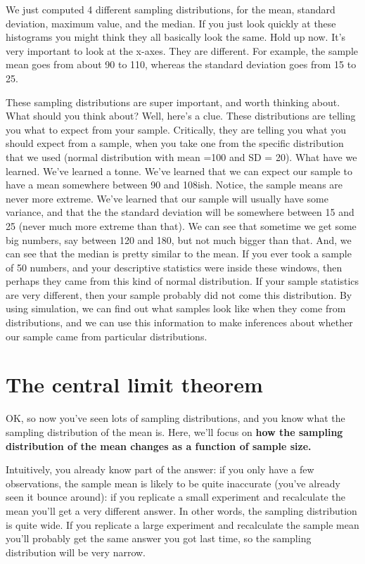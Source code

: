 \documentclass[
]{book}
\begin{document}
We just computed 4 different sampling distributions, for the mean, standard deviation, maximum value, and the median. If you just look quickly at these histograms you might think they all basically look the same. Hold up now. It's very important to look at the x-axes. They are different. For example, the sample mean goes from about 90 to 110, whereas the standard deviation goes from 15 to 25.

These sampling distributions are super important, and worth thinking about. What should you think about? Well, here's a clue. These distributions are telling you what to expect from your sample. Critically, they are telling you what you should expect from a sample, when you take one from the specific distribution that we used (normal distribution with mean =100 and SD = 20). What have we learned. We've learned a tonne. We've learned that we can expect our sample to have a mean somewhere between 90 and 108ish. Notice, the sample means are never more extreme. We've learned that our sample will usually have some variance, and that the the standard deviation will be somewhere between 15 and 25 (never much more extreme than that). We can see that sometime we get some big numbers, say between 120 and 180, but not much bigger than that. And, we can see that the median is pretty similar to the mean. If you ever took a sample of 50 numbers, and your descriptive statistics were inside these windows, then perhaps they came from this kind of normal distribution. If your sample statistics are very different, then your sample probably did not come this distribution. By using simulation, we can find out what samples look like when they come from distributions, and we can use this information to make inferences about whether our sample came from particular distributions.

\hypertarget{the-central-limit-theorem}{%
\section{The central limit theorem}\label{the-central-limit-theorem}}

OK, so now you've seen lots of sampling distributions, and you know what the sampling distribution of the mean is. Here, we'll focus on \textbf{how the sampling distribution of the mean changes as a function of sample size.}

Intuitively, you already know part of the answer: if you only have a few observations, the sample mean is likely to be quite inaccurate (you've already seen it bounce around): if you replicate a small experiment and recalculate the mean you'll get a very different answer. In other words, the sampling distribution is quite wide. If you replicate a large experiment and recalculate the sample mean you'll probably get the same answer you got last time, so the sampling distribution will be very narrow.
\end{document}

